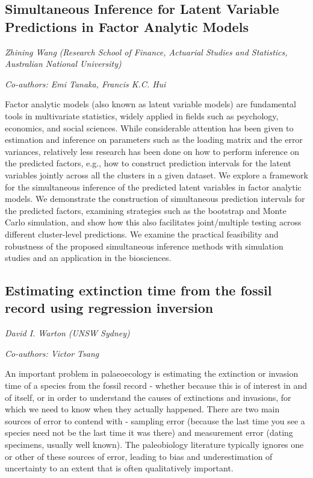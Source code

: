 \documentclass[
]{scrreprt}
\begin{document}
\subsection{Simultaneous Inference for Latent Variable Predictions in
Factor Analytic
Models}\label{simultaneous-inference-for-latent-variable-predictions-in-factor-analytic-models}

\emph{Zhining Wang} \emph{(Research School of
Finance, Actuarial Studies and Statistics, Australian National
University)}

\emph{Co-authors: Emi Tanaka, Francis K.C. Hui}

\setlength{\parskip}{0.5em}

Factor analytic models (also known as latent variable models) are
fundamental tools in multivariate statistics, widely applied in fields
such as psychology, economics, and social sciences. While considerable
attention has been given to estimation and inference on parameters such
as the loading matrix and the error variances, relatively less research
has been done on how to perform inference on the predicted factors,
e.g., how to construct prediction intervals for the latent variables
jointly across all the clusters in a given dataset. We explore a
framework for the simultaneous inference of the predicted latent
variables in factor analytic models. We demonstrate the construction of
simultaneous prediction intervals for the predicted factors, examining
strategies such as the bootstrap and Monte Carlo simulation, and show
how this also facilitates joint/multiple testing across different
cluster-level predictions. We examine the practical feasibility and
robustness of the proposed simultaneous inference methods with
simulation studies and an application in the biosciences.

\subsection{Estimating extinction time from the fossil record using
regression
inversion}\label{estimating-extinction-time-from-the-fossil-record-using-regression-inversion}

\emph{David I. Warton} \emph{(UNSW Sydney)}

\emph{Co-authors: Victor Tsang}

\setlength{\parskip}{0.5em}

An important problem in palaeoecology is estimating the extinction or
invasion time of a species from the fossil record - whether because this
is of interest in and of itself, or in order to understand the causes of
extinctions and invasions, for which we need to know when they actually
happened. There are two main sources of error to contend with - sampling
error (because the last time you see a species need not be the last time
it was there) and measurement error (dating specimens, usually well
known). The paleobiology literature typically ignores one or other of
these sources of error, leading to bias and underestimation of
uncertainty to an extent that is often qualitatively important.
\end{document}
